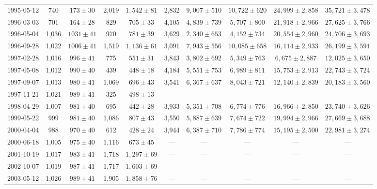 \begin{landscape}
\begin{longtable}{cccccccccc}
{1995-05-12} & 740 & {$173  \pm  30$} & 2,019 & {$1,542 \pm 81$} & 2,832 & {$9,007 \pm 510$} & {$10,722 \pm 620$} & {$24,999 \pm 2,858$} & {$35,721 \pm 3,478$} \\
{1996-03-03} & 701 & {$164  \pm  28$} & 829 & {$705 \pm 33$} & 4,105 & {$4,839 \pm 739$} & {$5,707 \pm 800$} & {$21,918 \pm 2,966$} & {$27,625 \pm 3,766$} \\
{1996-05-04} & 1,036 & {$1031  \pm  41$} & 970 & {$781 \pm 39$} & 3,629 & {$2,340 \pm 653$} & {$4,152 \pm 734$} & {$20,554 \pm 2,960$} & {$24,706 \pm 3,693$} \\
{1996-09-28} & 1,022 & {$1006  \pm  41$} & 1,519 & {$1,136 \pm 61$} & 3,091 & {$7,943 \pm 556$} & {$10,085 \pm 658$} & {$16,114 \pm 2,933$} & {$26,199 \pm 3,591$} \\
{1997-02-28} & 1,016 & {$996  \pm  41$} & 775 & {$551 \pm 31$} & 3,843 & {$3,802 \pm 692$} & {$5,349 \pm 763$} & {$6,675 \pm 2,887$} & {$12,025 \pm 3,650$} \\
{1997-05-08} & 1,012 & {$990  \pm  40$} & 439 & {$448 \pm 18$} & 4,184 & {$5,551 \pm 753$} & {$6,989 \pm 811$} & {$15,753 \pm 2,913$} & {$22,743 \pm 3,724$} \\
{1997-09-07} & 1,013 & {$980  \pm  41$} & 1,069 & {$696 \pm 43$} & 3,541 & {$6,367 \pm 637$} & {$8,043 \pm 721$} & {$12,140 \pm 2,839$} & {$20,183 \pm 3,560$} \\
{1997-11-21} & 1,021 & {$989  \pm  41$} & 325 & {$498 \pm 13$} & --- & --- & --- & --- & --- \\
{1998-04-29} & 1,007 & {$981  \pm  40$} & 695 & {$442 \pm 28$} & 3,933 & {$5,351 \pm 708$} & {$6,774 \pm 776$} & {$16,966 \pm 2,850$} & {$23,740 \pm 3,626$} \\
{1999-05-22} & 999 & {$981  \pm  40$} & 1,086 & {$807 \pm 43$} & 3,550 & {$5,887 \pm 639$} & {$7,674 \pm 722$} & {$19,994 \pm 2,966$} & {$27,669 \pm 3,688$} \\
{2000-04-04} & 988 & {$970  \pm  40$} & 612 & {$428 \pm 24$} & 3,944 & {$6,387 \pm 710$} & {$7,786 \pm 774$} & {$15,195 \pm 2,500$} & {$22,981 \pm 3,274$} \\
{2000-06-18} & 1,005 & {$975  \pm  40$} & 1,116 & {$673 \pm 45$} & --- & --- & --- & --- & --- \\
{2001-10-19} & 1,017 & {$983  \pm  41$} & 1,718 & {$1,297 \pm 69$} & --- & --- & --- & --- & --- \\
{2002-10-07} & 1,019 & {$987  \pm  41$} & 1,717 & {$1,603 \pm 69$} & --- & --- & --- & --- & --- \\
{2003-05-12} & 1,026 & {$989  \pm  41$} & 1,905 & {$1,858 \pm 76$} & --- & --- & --- & --- & --- \\

\end{longtable}
\end{landscape}
